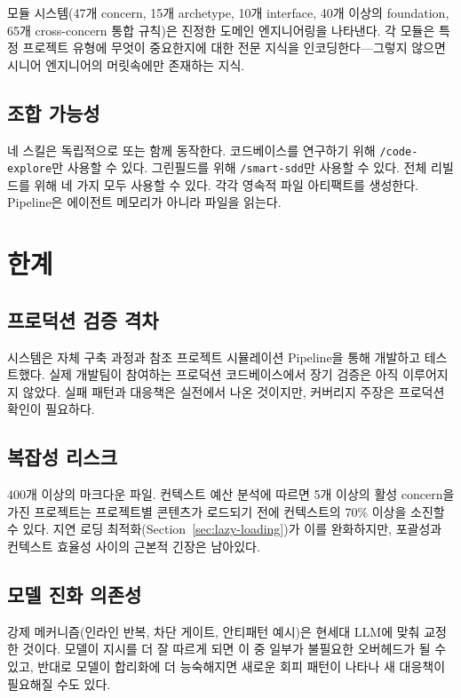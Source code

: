 \documentclass[11pt,a4paper,openright,twoside]{report}
\newcommand{\cmd}[1]{\texttt{/#1}}
\begin{document}
모듈 시스템(47개 concern, 15개 archetype, 10개 interface, 40개 이상의 foundation, 65개 cross-concern 통합 규칙)은 진정한 도메인 엔지니어링을 나타낸다. 각 모듈은 특정 프로젝트 유형에 무엇이 중요한지에 대한 전문 지식을 인코딩한다---그렇지 않으면 시니어 엔지니어의 머릿속에만 존재하는 지식.

\subsection{조합 가능성}

네 스킬은 독립적으로 또는 함께 동작한다. 코드베이스를 연구하기 위해 \cmd{code-explore}만 사용할 수 있다. 그린필드를 위해 \cmd{smart-sdd}만 사용할 수 있다. 전체 리빌드를 위해 네 가지 모두 사용할 수 있다. 각각 영속적 파일 아티팩트를 생성한다. Pipeline은 에이전트 메모리가 아니라 파일을 읽는다.

\section{한계}

\subsection{프로덕션 검증 격차}

시스템은 자체 구축 과정과 참조 프로젝트 시뮬레이션 Pipeline을 통해 개발하고 테스트했다. 실제 개발팀이 참여하는 프로덕션 코드베이스에서 장기 검증은 아직 이루어지지 않았다. 실패 패턴과 대응책은 실전에서 나온 것이지만, 커버리지 주장은 프로덕션 확인이 필요하다.

\subsection{복잡성 리스크}

400개 이상의 마크다운 파일. 컨텍스트 예산 분석에 따르면 5개 이상의 활성 concern을 가진 프로젝트는 프로젝트별 콘텐츠가 로드되기 전에 컨텍스트의 70\% 이상을 소진할 수 있다. 지연 로딩 최적화(Section~\ref{sec:lazy-loading})가 이를 완화하지만, 포괄성과 컨텍스트 효율성 사이의 근본적 긴장은 남아있다.

\subsection{모델 진화 의존성}

강제 메커니즘(인라인 반복, 차단 게이트, 안티패턴 예시)은 현세대 LLM에 맞춰 교정한 것이다. 모델이 지시를 더 잘 따르게 되면 이 중 일부가 불필요한 오버헤드가 될 수 있고, 반대로 모델이 합리화에 더 능숙해지면 새로운 회피 패턴이 나타나 새 대응책이 필요해질 수도 있다.
\end{document}
